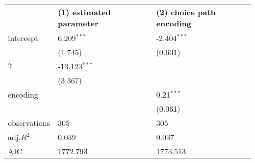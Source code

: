 \begin{tabular}{lll}
\hline
 & (1) estimated parameter & (2) choice path encoding \\
\hline
intercept & 6.209$^{***}$ & -2.404$^{***}$ \\
 & (1.745) & (0.601) \\
$\gamma$ & -13.123$^{***}$ &  \\
 & (3.367) &  \\
encoding &  & 0.21$^{***}$ \\
 &  & (0.061) \\
observations & 305 & 305 \\
adj.$R^2$ & 0.039 & 0.037 \\
AIC & 1772.793 & 1773.513 \\
\hline
\end{tabular}

